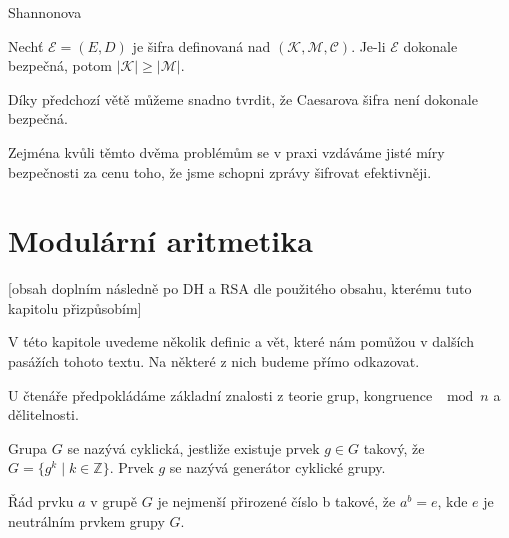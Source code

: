 \documentclass[
  program=infoi,
  biblatex,
  figures=false,
  glossaries,
  index
]{kidiplom}
\begin{document}
    \begin{theorem}
        Shannonova

        Nechť $\mathcal{E}  = (E, D)$ je šifra definovaná nad $(\mathcal{K},\mathcal{M},\mathcal{C})$.
        Je-li $\mathcal{E}$ dokonale bezpečná, potom $|\mathcal{K}| \geq |\mathcal{M}|$.
    \end{theorem}


    \medskip

    Díky předchozí větě můžeme snadno tvrdit, že Caesarova šifra není dokonale bezpečná.

    Zejména kvůli těmto dvěma problémům se v praxi vzdáváme jisté míry bezpečnosti za cenu toho, že jsme schopni zprávy šifrovat efektivněji.


\section{Modulární aritmetika}\label{sec:modular-arithmetic}

    [obsah doplním následně po DH a RSA dle použitého obsahu, kterému tuto kapitolu přizpůsobím]

    V této kapitole uvedeme několik definic a vět, které nám pomůžou v dalších pasážích tohoto textu.
    Na některé z nich budeme přímo odkazovat.
    
    U čtenáře předpokládáme základní znalosti z teorie grup, kongruence $\mod{n}$ a dělitelnosti.

    




    \begin{definition}
        Grupa $G$ se nazývá cyklická, jestliže existuje prvek $g \in G$ takový, že $G =\{g^k \mid k \in \mathbb{Z}\}$.
        Prvek $g$ se nazývá generátor cyklické grupy.
    \end{definition}

    \begin{definition}
        Řád prvku $a$ v grupě $G$ je nejmenší přirozené číslo b takové, že $a^b = e$, kde $e$ je neutrálním prvkem grupy $G$.
    \end{definition}
\end{document}
